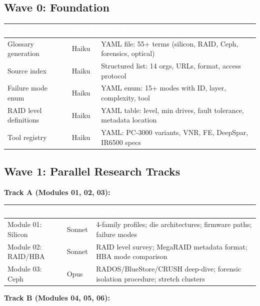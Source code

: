 \documentclass[11pt,letterpaper]{article}
\newcommand{\tableheader}[1]{\textbf{\sffamily\textcolor{white}{#1}}}
\begin{document}
\subsection{Wave 0: Foundation}

\begin{center}
\begin{tabularx}{\textwidth}{L{3cm}C{1.5cm}X}
\toprule
{}
\tableheader{Task} & \tableheader{Model} & \tableheader{Output} \\
\midrule
Glossary generation & Haiku & YAML file: 55+ terms (silicon, RAID, Ceph, forensics, optical) \\
Source index & Haiku & Structured list: 14 orgs, URLs, format, access protocol \\
Failure mode enum & Haiku & YAML enum: 15+ modes with ID, layer, complexity, tool \\
RAID level definitions & Haiku & YAML table: level, min drives, fault tolerance, metadata location \\
Tool registry & Haiku & YAML: PC-3000 variants, VNR, FE, DeepSpar, IR6500 specs \\
\bottomrule
\end{tabularx}
\end{center}

\subsection{Wave 1: Parallel Research Tracks}

\textbf{Track A (Modules 01, 02, 03):}

\begin{center}
\begin{tabularx}{\textwidth}{L{3cm}C{1.5cm}X}
\toprule
{}
\tableheader{Task} & \tableheader{Model} & \tableheader{Output} \\
\midrule
Module 01: Silicon & Sonnet & 4-family profiles; die architectures; firmware paths; failure modes \\
Module 02: RAID/HBA & Sonnet & RAID level survey; MegaRAID metadata format; HBA mode comparison \\
Module 03: Ceph & Opus & RADOS/BlueStore/CRUSH deep-dive; forensic isolation procedure; stretch clusters \\
\bottomrule
\end{tabularx}
\end{center}

\textbf{Track B (Modules 04, 05, 06):}
\end{document}
